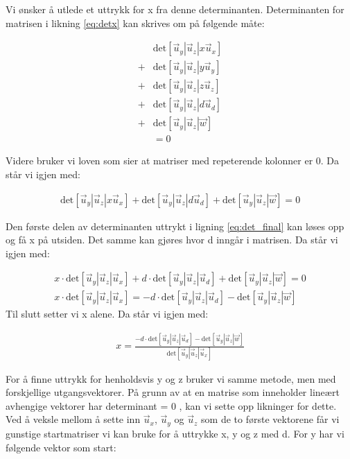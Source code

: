 Vi ønsker å utlede et uttrykk for x fra denne determinanten. Determinanten for matrisen i likning \ref{eq:detx} kan skrives om på følgende måte: 

\begin{align}
	&\text{det}[\vec{u}_y|\vec{u}_z | x\vec{u}_x] \nonumber
	\\+ &\text{det}[\vec{u}_y|\vec{u}_z | y\vec{u}_y] \nonumber
	\\+ &\text{det}[\vec{u}_y|\vec{u}_z | z\vec{u}_z] \nonumber
	 \\+&\text{det}[\vec{u}_y|\vec{u}_z | d\vec{u}_d] \nonumber
	\\+ &\text{det}[\vec{u}_y|\vec{u}_z | \vec{w}]\nonumber
	\\&=0
\end{align}

Videre bruker vi loven som sier at matriser med repeterende kolonner er 0. Da står vi igjen med: 

\begin{align} \label{eq:det_final}
	\text{det}[\vec{u}_y|\vec{u}_z | x\vec{u}_x] 
	+ \text{det}[\vec{u}_y|\vec{u}_z | d\vec{u}_d] 
	+ \text{det}[\vec{u}_y|\vec{u}_z | \vec{w}]
	=0
\end{align}

Den første delen av determinanten uttrykt i ligning \ref{eq:det_final} kan løses opp og få x på utsiden\cite{TheDeterminant}. Det samme kan gjøres hvor d inngår i matrisen. Da står vi igjen med: 

\begin{align}
	x\cdot\text{det}[\vec{u}_y|\vec{u}_z | \vec{u}_x] 
	+ d\cdot\text{det}[\vec{u}_y|\vec{u}_z | \vec{u}_d] 
	+ \text{det}[\vec{u}_y|\vec{u}_z | \vec{w}]
	=0 \nonumber 
	\\ 
	x\cdot\text{det}[\vec{u}_y|\vec{u}_z | \vec{u}_x] 
	= -d\cdot\text{det}[\vec{u}_y|\vec{u}_z | \vec{u}_d] 
	-\text{det}[\vec{u}_y|\vec{u}_z | \vec{w}]\nonumber 
\end{align}
Til slutt setter vi x alene. Da står vi igjen med: 

\begin{align}
    x=\frac{-d\cdot\text{det}[\vec{u}_y|\vec{u}_z | \vec{u}_d] 
	-\text{det}[\vec{u}_y|\vec{u}_z | \vec{w}]}{\text{det}[\vec{u}_y|\vec{u}_z | \vec{u}_x]}
\end{align}

For å finne uttrykk for henholdsvis y og z bruker vi samme metode, men med forskjellige utgangsvektorer. På grunn av at en matrise som inneholder lineært avhengige vektorer har determinant = 0 \cite{Determinants}, kan vi sette opp likninger for dette. Ved å veksle mellom å sette inn $\vec{u}_x$, $\vec{u}_y$ og $\vec{u}_z$ som de to første vektorene får vi gunstige startmatriser vi kan bruke for å uttrykke x, y og z med d. For y har vi følgende vektor som start: 

